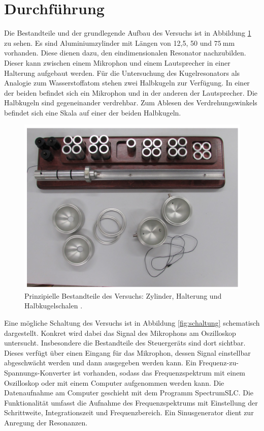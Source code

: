 \section{Durchführung}
\label{sec:Durchführung}
Die Bestandteile und der grundlegende Aufbau des Versuchs ist in Abbildung \ref{fig:grundlegenderAufbau} zu sehen. Es sind Aluminiumzylinder mit Längen von 12,5, 50 und $\SI{75}{\milli\meter}$ vorhanden. Diese dienen dazu, den eindimensionalen Resonator nachzubilden. Dieser kann zwischen einem Mikrophon und einem Lautsprecher in einer Halterung aufgebaut werden. Für die Untersuchung des Kugelresonators als Analogie zum Wasserstoffatom stehen zwei Halbkugeln zur Verfügung. In einer der beiden befindet sich ein Mikrophon und in der anderen der Lautsprecher. Die Halbkugeln sind gegeneinander verdrehbar. Zum
Ablesen des Verdrehungswinkels befindet sich eine Skala auf einer der beiden Halbkugeln.\\

\begin{figure}
  \centering
  \includegraphics[width=\textwidth]{data/aufbau.png}
  \caption{Prinzipielle Bestandteile des Versuchs: Zylinder, Halterung und Halbkugelschalen \cite{Versuchsanleitung}.}
  \label{fig:grundlegenderAufbau}
\end{figure}
Eine mögliche Schaltung des Versuchs ist in Abbildung \ref{fig:schaltung} schematisch dargestellt. Konkret wird dabei das Signal des Mikrophons am Oszilloskop untersucht. Insbesondere die Bestandteile des Steuergeräts sind dort sichtbar.
Dieses verfügt über einen Eingang für das Mikrophon, dessen Signal einstellbar abgeschwächt werden und dann ausgegeben werden kann. Ein Frequenz-zu-Spannungs-Konverter ist vorhanden, sodass das Frequenzspektrum mit einem Oszilloskop oder mit einem Computer aufgenommen werden kann. Die Datenaufnahme am Computer geschieht mit dem Programm SpectrumSLC. Die Funktionalität umfasst die Aufnahme des Frequenzspektrums mit Einstellung der Schrittweite, Integrationszeit und Frequenzbereich. Ein Sinusgenerator dient zur Anregung der Resonanzen.\\

